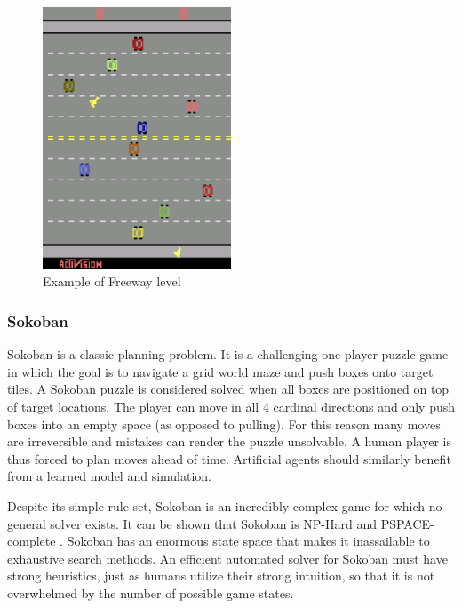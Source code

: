 \begin{figure}[H]
\includegraphics[width=0.5\textwidth,keepaspectratio]{figures/Freeway.png}
\caption[Sokoban]{Example of Freeway level}
\label{Fig.Boxing}
\end{figure}


\subsubsection{Sokoban}

Sokoban is a classic planning problem. It is a challenging one-player puzzle game in which the goal is to navigate a grid world maze and push boxes onto target tiles. A Sokoban puzzle is considered solved when all boxes are positioned on top of target locations. The player can move in all 4 cardinal directions and only push boxes into an empty space (as opposed to pulling). For this reason many moves are irreversible and mistakes can render the puzzle unsolvable. A human player is thus forced to plan moves ahead of time. Artificial agents should similarly benefit from a learned model and simulation.

Despite its simple rule set, Sokoban is an incredibly complex game for which no general solver exists. It can be shown that Sokoban is NP-Hard and PSPACE-complete \cite{Benchmark.Sokoban}. Sokoban has an enormous state space that makes it inassailable to exhaustive search methods. An efficient automated solver for Sokoban must have strong heuristics, just as humans utilize their strong intuition, so that it is not overwhelmed by the number of possible game states.

